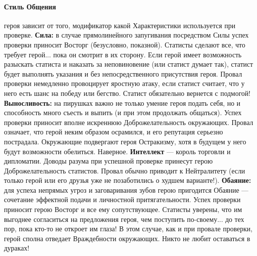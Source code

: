\paragraph{Стиль Общения} героя зависит от того, модификатор какой Характеристики используется при проверке.
\newline \textbf{Сила:} в случае прямолинейного запугивания посредством Силы успех проверки приносит Восторг (безусловно, показной). Статисты сделают все, что требует герой... пока он смотрит в их сторону. Если герой имеет возможность разыскать статиста и наказать за неповиновение (или статист думает так), статист будет выполнять указания и без непосредственного присутствия героя. Провал проверки немедленно провоцирует яростную атаку, если статист считает, что у него есть шанс на победу или бегство. Статист обязательно вернется с подмогой!
\newline \textbf{Выносливость:} на пирушках важно не только умение героя подать себя, но и способность много съесть и выпить (и при этом продолжать общаться). Успех проверки приносит вполне искреннюю Доброжелательность окружающих. Провал означает, что герой неким образом осрамился, и его репутация серьезно пострадала. Окружающие подвергают героя Остракизму, хотя в будущем у него будут возможности обелиться. Наверное.
\newline \textbf{Интеллект} — король торговли и дипломатии. Доводы разума при успешной проверке принесут герою Доброжелательность статистов. Провал обычно приводит к Нейтралитету (если только герой или его друзья уже не позаботились о худшем варианте!).
\newline \textbf{Обаяние:} для успеха непрямых угроз и заговаривания зубов герою пригодится Обаяние — сочетание эффектной подачи и личностной притягательности. Успех проверки приносит герою Восторг и все ему сопутствующее. Статисты уверены, что им выгоднее согласиться на предложения героя, чем поступить по-своему... до тех пор, пока кто-то не откроет им глаза! В этом случае, как и при провале проверки, герой сполна отведает Враждебности окружающих. Никто не любит оставаться в дураках!
